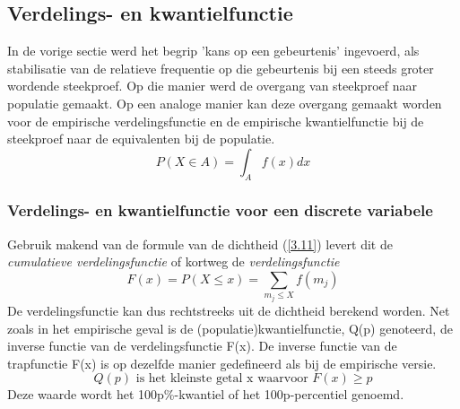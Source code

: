 \documentclass[titlepage]{article}
\numberwithin{equation}{section}
\begin{document}
 \subsection{Verdelings- en kwantielfunctie}
 In de vorige sectie werd het begrip 'kans op een gebeurtenis' ingevoerd, als stabilisatie van de relatieve frequentie op die gebeurtenis bij een steeds groter wordende steekproef. Op die manier werd de overgang van steekproef naar populatie gemaakt. Op een analoge manier kan deze overgang gemaakt worden voor de empirische verdelingsfunctie en de empirische kwantielfunctie bij de steekproef naar de equivalenten bij de populatie.
 \begin{equation}
 	P(X\in A) = \int_A f(x)dx
 	\label{3.14}
 \end{equation}
 \subsubsection{Verdelings- en kwantielfunctie voor een discrete variabele}
 Gebruik makend van de formule van de dichtheid (\ref{3.11}) levert dit de \textit{cumulatieve verdelingsfunctie} of kortweg de \textit{verdelingsfunctie}
 \begin{equation}
 	F(x) = P(X\leq x) = \sum_{m_j\leq X} f(m_j)
 	\label{3.15}
 \end{equation}
 De verdelingsfunctie kan dus rechtstreeks uit de dichtheid berekend worden.\newline\newline
 Net zoals in het empirische geval is de (populatie)kwantielfunctie, Q(p) genoteerd, de inverse functie van de verdelingsfunctie F(x). De inverse functie van de trapfunctie F(x) is op dezelfde manier gedefineerd als bij de empirische versie.
 \begin{equation}
 	Q(p) \text{ is het kleinste getal x waarvoor } F(x) \geq p
 	\label{3.16}
 \end{equation}
 Deze waarde wordt het 100p\%-kwantiel of het 100p-percentiel genoemd.
\end{document}
